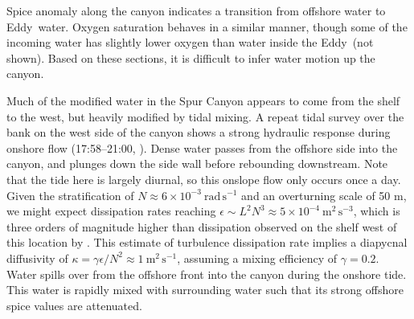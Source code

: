 \documentclass[draft]{agujournal2019}
\newcommand*{\Eddy}{{\sc Eddy}}
\providecommand{\DIFadd}[1]{{\protect\color{blue}\uwave{#1}}} %
\providecommand{\DIFdel}[1]{{\protect\color{red}\sout{#1}}}                      %
\providecommand{\DIFaddbegin}{} %
\providecommand{\DIFaddend}{} %
\providecommand{\DIFdelbegin}{} %
\providecommand{\DIFdelend}{} %
\begin{document}
Spice anomaly along the canyon indicates a transition from offshore water to \Eddy\ water.  Oxygen saturation behaves in a similar manner, though some of the incoming water has slightly lower oxygen than water inside the \Eddy\ (not shown).  Based on these sections, it is difficult to infer water motion up the canyon.

Much of the modified water in the Spur Canyon appears to come from the shelf to the west, but heavily modified by tidal mixing. A repeat tidal survey over the bank on the west side of the canyon shows a strong hydraulic response during onshore flow (17:58--21:00, ).  Dense water passes from the offshore side into the canyon, and plunges down the side wall before rebounding downstream.  Note that the tide here is largely diurnal, so this onslope flow only occurs once a day.  Given the stratification of $N\approx 6\times10^{-3} \ \mathrm{rad\,s^{-1}}$ and an overturning scale of 50 m, we might expect dissipation rates reaching $\epsilon \sim L^2N^{3} \approx 5\times10^{-4}\ \mathrm{m^2\,s^{-3}}$, which is three orders of magnitude higher than dissipation observed on the shelf west of this location by .  This estimate of turbulence dissipation rate implies a diapycnal diffusivity of \DIFdelbegin \DIFdel{$\kappa = \gamma \epsilon / N^2 \approx 1\ \mathrm{m^2\,s^{-1}}$}\DIFdelend \DIFaddbegin \DIFadd{$\kappa = \gamma \epsilon / N^2 \approx 0.5$ -- $5\ \mathrm{m^2\,s^{-1}}$}\DIFaddend , assuming a mixing efficiency of $\gamma=0.2$. Water spills over from the offshore front into the canyon during the onshore tide.  This water is rapidly mixed with surrounding water such that its strong offshore spice values are attenuated.
\end{document}
